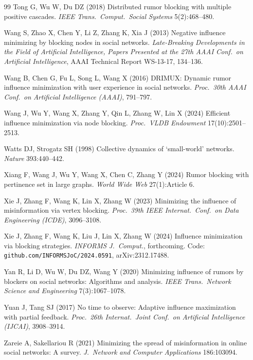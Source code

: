 \documentclass[11pt]{article}
\theoremstyle{definition}
\theoremstyle{remark}
\begin{document}
\begin{thebibliography}{99}
Tong G, Wu W, Du DZ (2018) Distributed rumor blocking with multiple
  positive cascades. \emph{IEEE Trans.\ Comput.\ Social Systems} 5(2):468--480.

Wang S, Zhao X, Chen Y, Li Z, Zhang K, Xia J (2013) Negative influence
  minimizing by blocking nodes in social networks. \emph{Late-Breaking
  Developments in the Field of Artificial Intelligence, Papers Presented at
  the 27th AAAI Conf.\ on Artificial Intelligence}, AAAI Technical Report
  WS-13-17, 134--136.

Wang B, Chen G, Fu L, Song L, Wang X (2016) DRIMUX: Dynamic rumor influence
  minimization with user experience in social networks. \emph{Proc.\ 30th
  AAAI Conf.\ on Artificial Intelligence (AAAI)}, 791--797.

Wang J, Wu Y, Wang X, Zhang Y, Qin L, Zhang W, Lin X (2024) Efficient
  influence minimization via node blocking. \emph{Proc.\ VLDB Endowment}
  17(10):2501--2513.

Watts DJ, Strogatz SH (1998) Collective dynamics of `small-world'
  networks. \emph{Nature} 393:440--442.

Xiang F, Wang J, Wu Y, Wang X, Chen C, Zhang Y (2024) Rumor blocking with
  pertinence set in large graphs. \emph{World Wide Web} 27(1):Article 6.

Xie J, Zhang F, Wang K, Lin X, Zhang W (2023) Minimizing the influence of
  misinformation via vertex blocking. \emph{Proc.\ 39th IEEE Internat.\
  Conf.\ on Data Engineering (ICDE)}, 3096--3108.

Xie J, Zhang F, Wang K, Liu J, Lin X, Zhang W (2024) Influence minimization
  via blocking strategies. \emph{INFORMS J.\ Comput.}, forthcoming. Code:
  \texttt{github.com/INFORMSJoC/2024.0591}, arXiv:2312.17488.

Yan R, Li D, Wu W, Du DZ, Wang Y (2020) Minimizing influence of rumors by
  blockers on social networks: Algorithms and analysis. \emph{IEEE Trans.\
  Network Science and Engineering} 7(3):1067--1078.

Yuan J, Tang SJ (2017) No time to observe: Adaptive influence maximization
  with partial feedback. \emph{Proc.\ 26th Internat.\ Joint Conf.\ on
  Artificial Intelligence (IJCAI)}, 3908--3914.

Zareie A, Sakellariou R (2021) Minimizing the spread of misinformation in
  online social networks: A survey. \emph{J.\ Network and Computer
  Applications} 186:103094.

\end{thebibliography}
\end{document}
